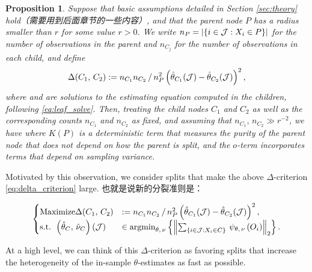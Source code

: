 \documentclass[aos]{imsart}
\theoremstyle{plain}
\newtheorem{prop}{Proposition}
\theoremstyle{definition}
\theoremstyle{remark}
\begin{document}
\begin{CJK}{UTF8}{gbsn}
\begin{prop}
\label{prop:motivation}
Suppose that basic assumptions detailed in Section \ref{sec:theory} hold（需要用到后面章节的一些内容）,
and that the parent node $P$ has a radius smaller than
$r$ for some value $r > 0$. We write $n_P = \left\lvert\left\{i\in\mathcal{J} : X_i \in P\right\}\right\rvert$ for the number of
observations in the parent and $n_{C_j}$ for the number of observations in each child, and define
\begin{equation}
\label{eq:delta_criterion}
\Delta(C_1, \, C_2) := {n_{C_1} n_{C_2}}\,/\,{n_P^2}  \p{\htheta_{C_1}(\mathcal{J}) - \htheta_{C_2}(\mathcal{J})}^2,
\end{equation}
where  and  are solutions to the
estimating equation computed in the children, following \eqref{eq:leaf_solve}.
Then, treating the child nodes $C_1$ and $C_2$ as well as the corresponding counts $n_{C_1}$ and $n_{C_2}$
as fixed, and assuming that $n_{C_1}, \, n_{C_2} \gg r^{-2}$, we have
where $K(P)$ is a deterministic term that measures the purity of the parent node
that does not depend on how the parent is split, and the $o$-term incorporates terms that depend on
sampling variance.
\end{prop}

Motivated by this observation, we consider splits that make the above $\Delta$-criterion
\eqref{eq:delta_criterion} large. 也就是说新的分裂准则是：

\begin{equation*}
    \begin{cases}
    \text{Maximize}  \Delta(C_1, \, C_2) &:= {n_{C_1} n_{C_2}}\,/\,{n_P^2}  \p{\htheta_{C_1}(\mathcal{J}) - \htheta_{C_2}(\mathcal{J})}^2, \\
     \text{s.t. }   \p{\htheta_{C}, \, \hnu_{C}}(\mathcal{J}) &\in \argmin_{\theta, \, \nu} \cb{\Norm{\sum_{\cb{i\in\mathcal{J} : X_i \in C}} \, \psi_{\theta, \, \nu}\p{O_i}}_2}.
    \end{cases}
\end{equation*}



At a high level, we can think of this $\Delta$-criterion as favoring splits that increase the heterogeneity of the in-sample $\theta$-estimates as fast as possible.


\end{CJK}
\end{document}
